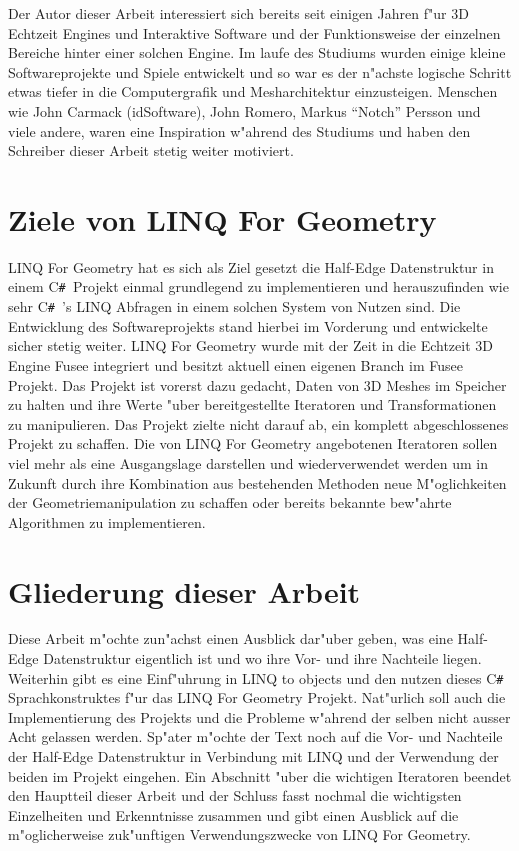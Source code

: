 \documentclass[pagesize, paper=a4, fontsize=12pt,titlepage=true, headings=small, headnosepline, abstractoff, liststotoc, nochapterprefix, plainheadsepline]{scrreprt}
\newcommand{\CSS}{C\texttt{\# }}
\newcommand{\LFG}{LINQ For Geometry}
\newcommand{\LFGS}{LINQ For Geometry }
\newcommand{\LQ}{ LINQ }
\newcommand{\HES}{Half-Edge Datenstruktur }
\begin{document}
Der Autor dieser Arbeit interessiert sich bereits seit einigen Jahren f"ur 3D Echtzeit Engines und Interaktive Software und der Funktionsweise der einzelnen Bereiche hinter einer solchen Engine. Im laufe des Studiums wurden einige kleine Softwareprojekte und Spiele entwickelt und so war es der n"achste logische Schritt etwas tiefer in die Computergrafik und Mesharchitektur einzusteigen. Menschen wie John Carmack (idSoftware), John Romero, Markus "`Notch"' Persson und viele andere, waren eine Inspiration w"ahrend des Studiums und haben den Schreiber dieser Arbeit stetig weiter motiviert.
	
	\section {Ziele von \LFG}
	\LFGS hat es sich als Ziel gesetzt die \HES in einem \CSS Projekt einmal grundlegend zu implementieren und herauszufinden wie sehr \CSS's LINQ Abfragen in einem solchen System von Nutzen sind. Die Entwicklung des Softwareprojekts stand hierbei im Vorderung und entwickelte sicher stetig weiter. \LFGS wurde mit der Zeit in die Echtzeit 3D Engine Fusee integriert und besitzt aktuell einen eigenen Branch im Fusee Projekt. Das Projekt ist vorerst dazu gedacht, Daten von 3D Meshes im Speicher zu halten und ihre Werte "uber bereitgestellte Iteratoren und Transformationen zu manipulieren. Das Projekt zielte nicht darauf ab, ein komplett abgeschlossenes Projekt zu schaffen. Die von \LFGS angebotenen Iteratoren sollen viel mehr als eine Ausgangslage darstellen und wiederverwendet werden um in Zukunft durch ihre Kombination aus bestehenden Methoden neue M"oglichkeiten der Geometriemanipulation zu schaffen oder bereits bekannte bew"ahrte Algorithmen zu implementieren.
	\section{Gliederung dieser Arbeit}
	Diese Arbeit m"ochte zun"achst einen Ausblick dar"uber geben, was eine \HES eigentlich ist und wo ihre Vor- und ihre Nachteile liegen. Weiterhin gibt es eine Einf"uhrung in LINQ to objects und den nutzen dieses \CSS Sprachkonstruktes f"ur das \LFGS Projekt. Nat"urlich soll auch die Implementierung des Projekts und die Probleme w"ahrend der selben nicht ausser Acht gelassen werden. Sp"ater m"ochte der Text noch auf die Vor- und Nachteile der \HES in Verbindung mit LINQ und der Verwendung der beiden im Projekt eingehen. Ein Abschnitt "uber die wichtigen Iteratoren beendet den Hauptteil dieser Arbeit und der Schluss fasst nochmal die wichtigsten Einzelheiten und Erkenntnisse zusammen und gibt einen Ausblick auf die m"oglicherweise zuk"unftigen Verwendungszwecke von \LFG.
\end{document}
